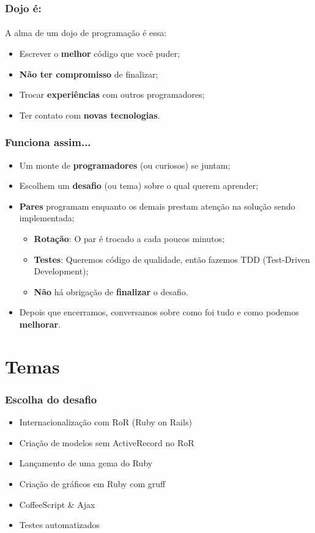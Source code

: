 \documentclass{beamer}
\begin{document}
\begin{frame}
  \frametitle{Dojo é:}
  \framesubtitle{}
  A alma de um dojo de programação é essa:
  \begin{itemize}
    \item Escrever o \textbf{melhor} código que você puder;
    \item \textbf{Não ter compromisso} de finalizar;
    \item Trocar \textbf{experiências} com outros programadores;
    \item Ter contato com \textbf{novas tecnologias}.
  \end{itemize}
\end{frame}

\begin{frame}
  \frametitle{Funciona assim...}

  \begin{itemize}
    \item Um monte de \textbf{programadores} (ou curiosos) se juntam;
    \item Escolhem um \textbf{desafio} (ou tema) sobre o qual querem aprender;
    \item \textbf{Pares} programam enquanto os demais prestam atenção na solução sendo implementada;
      \begin{itemize}
        \item \textbf{Rotação}: O par é trocado a cada poucos minutos;
        \item \textbf{Testes}: Queremos código de qualidade, então fazemos TDD (Test-Driven Development);
        \item \textbf{Não} há obrigação de \textbf{finalizar} o desafio.
      \end{itemize}
    \item Depois que encerramos, conversamos sobre como foi tudo e como podemos \textbf{melhorar}.
  \end{itemize}
\end{frame}

\section{Temas}
\begin{frame}
  \frametitle{Escolha do desafio}

  \begin{itemize}
    \item Internacionalização com RoR (Ruby on Rails)
    \item Criação de modelos sem ActiveRecord no RoR
    \item Lançamento de uma gema do Ruby
    \item Criação de gráficos em Ruby com gruff
    \item CoffeeScript \& Ajax
    \item Testes automatizados
  \end{itemize}
\end{frame}
\end{document}
